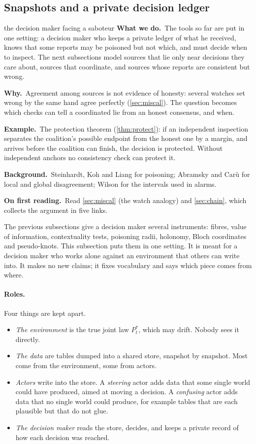 \documentclass[11pt]{article}
\theoremstyle{definition}\newtheorem{definition}[theorem]{Definition}\newtheorem{remark}[theorem]{Remark}\newtheorem{example}[theorem]{Example}\newtheorem{problem}[theorem]{Open problem}\crefname{problem}{Problem}{Problems}
\newcommand{\rbwhat}{\textcolor{rbWhat}{\textbf{What we do.}}~}\newcommand{\rbwhy}{\par\smallskip\textcolor{rbWhy}{\textbf{Why.}}~}
\newcommand{\rbex}{\par\smallskip\textcolor{rbEx}{\textbf{Example.}}~}\newcommand{\rbbg}{\par\smallskip\textcolor{rbBg}{\textbf{Background.}}~}
\newcommand{\rbfirst}{\par\smallskip\textcolor{rbFirst}{\textbf{On first reading.}}~}
\begin{document}
\subsection{Snapshots and a private decision ledger}\label{sec:ledgerdm}
\begin{readerbox}{the decision maker facing a saboteur}
\rbwhat The tools so far are put in one setting: a decision maker who keeps a private ledger of what he received, knows that some reports may be poisoned but not which, and must decide when to inspect. The next subsections model sources that lie only near decisions they care about, sources that coordinate, and sources whose reports are consistent but wrong.
\rbwhy Agreement among sources is not evidence of honesty: several watches set wrong by the same hand agree perfectly (\cref{sec:miscal}). The question becomes which checks can tell a coordinated lie from an honest consensus, and when.
\rbex The protection theorem (\cref{thm:protect}): if an independent inspection separates the coalition's possible endpoint from the honest one by a margin, and arrives before the coalition can finish, the decision is protected. Without independent anchors no consistency check can protect it.
\rbbg Steinhardt, Koh and Liang \cite{SteinhardtKohLiang2017} for poisoning; Abramsky and Car\`u \cite{AbramskyCaru2019} for local and global disagreement; Wilson \cite{Wilson1927} for the intervals used in alarms.
\rbfirst Read \cref{sec:miscal} (the watch analogy) and \cref{sec:chain}, which collects the argument in five links.
\end{readerbox}
The previous subsections give a decision maker several instruments: fibres, value of information, contextuality tests, poisoning
radii, holonomy, Bloch coordinates and pseudo-knots. This subsection puts them in one setting. It is meant for a decision maker who
works alone against an environment that others can write into. It makes no new claims; it fixes vocabulary and says which piece
comes from where.

\paragraph{Roles.} Four things are kept apart.
\begin{itemize}
\item \emph{The environment} is the true joint law $P^*_t$, which may drift. Nobody sees it directly.
\item \emph{The data} are tables dumped into a shared store, snapshot by snapshot. Most come from the environment, some from actors.
\item \emph{Actors} write into the store. A \emph{steering} actor adds data that some single world could have produced, aimed at moving a
decision. A \emph{confusing} actor adds data that no single world could produce, for example tables that are each plausible but that
do not glue.
\item \emph{The decision maker} reads the store, decides, and keeps a private record of how each decision was reached.
\end{itemize}
\end{document}
